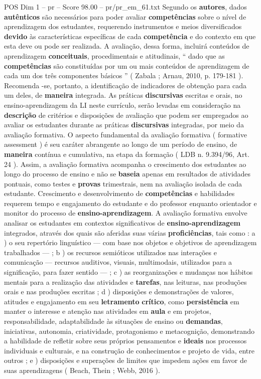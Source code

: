 \begin{textsample}{POS Dim 1 – pr – Score 98.00 – pr/pr\_em\_61.txt}
Segundo os \textbf{autores}, dados \textbf{autênticos} são necessários para poder avaliar \textbf{competências} sobre o nível de aprendizagem dos estudantes, requerendo instrumentos e meios diversificados \textbf{devido} às características específicas de cada \textbf{competência} e do contexto em que esta deve ou pode ser realizada.
A avaliação, dessa forma, incluirá conteúdos de aprendizagem \textbf{conceituais}, procedimentais e atitudinais, “ dado que as \textbf{competências} são constituídas por um ou mais conteúdos de aprendizagem de cada um dos três componentes básicos ” ( Zabala ; Arnau, 2010, p. 179-181 ).
Recomenda -se, portanto, a identificação de indicadores de obtenção para cada um deles, de \textbf{maneira} integrada.
As práticas \textbf{discursivas} escritas e orais, no ensino-aprendizagem da LI neste currículo, serão levadas em consideração na \textbf{descrição} de critérios e disposições de avaliação que podem ser empregados ao avaliar os estudantes durante as práticas \textbf{discursivas} integradas, por meio da avaliação formativa.
O aspecto fundamental da avaliação formativa ( formative assessment ) é seu caráter abrangente ao longo de um período de ensino, de \textbf{maneira} contínua e cumulativa, na etapa da formação ( LDB n. 9.394/96, Art. 24 ).
Assim, a avaliação formativa acompanha o crescimento dos estudantes ao longo do processo de ensino e não se \textbf{baseia} apenas em resultados de atividades pontuais, como testes e \textbf{provas} trimestrais, nem na avaliação isolada de cada estudante.
Crescimento e desenvolvimento de \textbf{competências} e habilidades requerem tempo e engajamento do estudante e do professor enquanto orientador e monitor do processo de \textbf{ensino-aprendizagem}.
A avaliação formativa envolve analisar os estudantes em contextos significativos de \textbf{ensino-aprendizagem} integrados, através dos quais são aferidas suas várias \textbf{proficiências}, tais como : a ) o seu repertório linguístico — com base nos objetos e objetivos de aprendizagem trabalhados — ; b ) os recursos semióticos utilizados nas interações e comunicação — recursos auditivos, visuais, multimodais, utilizados para a significação, para fazer sentido — ; c ) as reorganizações e mudanças nos hábitos mentais para a realização das atividades e \textbf{tarefas}, nas leituras, nas produções orais e nas produções escritas ; d ) disposições e demonstrações de valores, atitudes e engajamento em seu \textbf{letramento} \textbf{crítico}, como \textbf{persistência} em manter o interesse e atenção nas atividades em \textbf{aula} e em projetos, responsabilidade, adaptabilidade às situações de ensino ou \textbf{demandas}, iniciativas, autonomia, criatividade, protagonismo e metacognição, demonstrando a habilidade de refletir sobre seus próprios pensamentos e \textbf{ideais} nos processos individuais e culturais, e na construção de conhecimentos e projeto de vida, entre outros ; e ) disposições e superações de limites que impedem ações em favor de suas aprendizagens ( Beach, Thein ; Webb, 2016 ).

\end{textsample}
